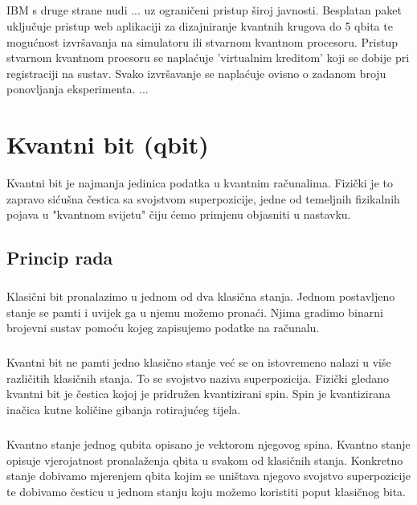 \documentclass[times, utf8, zavrsni]{fer}
\begin{document}
\paragraph{}
IBM s druge strane nudi ... uz ograničeni pristup široj javnosti. Besplatan paket uključuje pristup web aplikaciji za dizajniranje kvantnih krugova do 5 qbita te mogućnost izvršavanja na simulatoru ili stvarnom kvantnom procesoru. Pristup stvarnom kvantnom proesoru se naplaćuje 'virtualnim kreditom' koji se dobije pri registraciji na sustav. Svako izvršavanje se naplaćuje ovisno o zadanom broju ponovljanja eksperimenta. ...

\chapter{Kvantni bit (qbit)}
Kvantni bit je najmanja jedinica podatka u kvantnim računalima. Fizički je to zapravo sićušna čestica sa svojstvom superpozicije, jedne od temeljnih fizikalnih pojava u "kvantnom svijetu" čiju ćemo primjenu objasniti u nastavku.

\section{Princip rada}
\paragraph{}
Klasični bit pronalazimo u jednom od dva klasična stanja. Jednom postavljeno stanje se pamti i uvijek ga u njemu možemo pronaći. Njima gradimo binarni brojevni sustav pomoću kojeg zapisujemo podatke na računalu.

\paragraph{}
Kvantni bit ne pamti jedno klasično stanje već se on istovremeno nalazi u više različitih klasičnih stanja. To se svojstvo naziva superpozicija. Fizički gledano kvantni bit je čestica kojoj je pridružen kvantizirani spin. Spin je kvantizirana inačica kutne količine gibanja rotirajućeg tijela.

\paragraph{}
Kvantno stanje jednog qubita opisano je vektorom njegovog spina. Kvantno stanje opisuje vjerojatnost pronalaženja qbita u svakom od klasičnih stanja. Konkretno stanje dobivamo mjerenjem qbita kojim se uništava njegovo svojstvo superpozicije te dobivamo česticu u jednom stanju koju možemo koristiti poput klasičnog bita.
\end{document}
